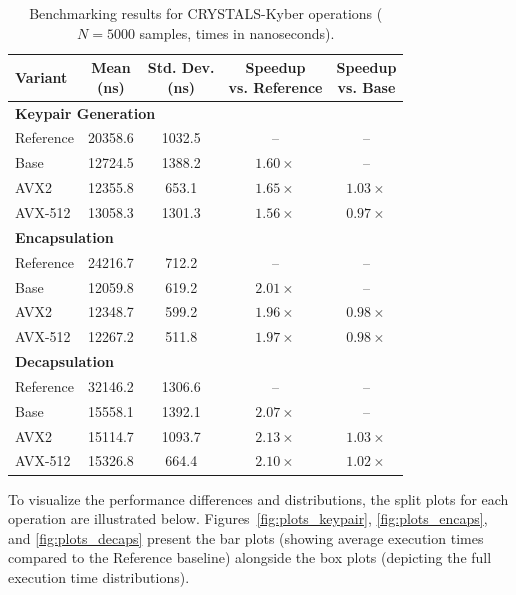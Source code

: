 \begin{table}[htbp]
    \centering
    \caption{Benchmarking results for CRYSTALS-Kyber operations ($N = 5000$ samples, times in nanoseconds). }
    \label{tab:bench_results}
    \begin{tabular}{lcccc}
        \toprule
        Variant & \shortstack{Mean\\(ns)} & \shortstack{Std. Dev.\\(ns)} & \shortstack{Speedup\\vs. Reference} & \shortstack{Speedup\\vs. Base} \\
        \midrule
        \multicolumn{5}{l}{\textbf{Keypair Generation}} \\
        Reference & 20358.6 & 1032.5 & -- & -- \\
        Base & 12724.5 & 1388.2 & $1.60\times$ & -- \\
        AVX2 & 12355.8 & 653.1 & $1.65\times$ & $1.03\times$ \\
        AVX-512 & 13058.3 & 1301.3 & $1.56\times$ & $0.97\times$ \\
        \midrule
        \multicolumn{5}{l}{\textbf{Encapsulation}} \\
        Reference & 24216.7 & 712.2 & -- & -- \\
        Base & 12059.8 & 619.2 & $2.01\times$ & -- \\
        AVX2 & 12348.7 & 599.2 & $1.96\times$ & $0.98\times$ \\
        AVX-512 & 12267.2 & 511.8 & $1.97\times$ & $0.98\times$ \\
        \midrule
        \multicolumn{5}{l}{\textbf{Decapsulation}} \\
        Reference & 32146.2 & 1306.6 & -- & -- \\
        Base & 15558.1 & 1392.1 & $2.07\times$ & -- \\
        AVX2 & 15114.7 & 1093.7 & $2.13\times$ & $1.03\times$ \\
        AVX-512 & 15326.8 & 664.4 & $2.10\times$ & $1.02\times$ \\
        \bottomrule
    \end{tabular}
\end{table}

To visualize the performance differences and distributions, the split plots for each operation are illustrated below. Figures~\ref{fig:plots_keypair}, \ref{fig:plots_encaps}, and \ref{fig:plots_decaps} present the bar plots (showing average execution times compared to the Reference baseline) alongside the box plots (depicting the full execution time distributions).

